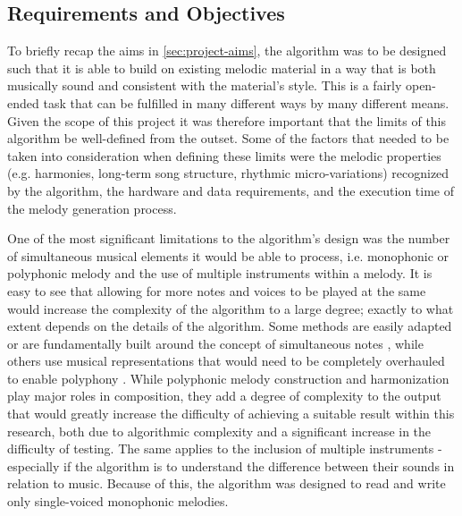 \documentclass[ author={Stephen Livermore-Tozer},
				supervisor={Dr. Peter Flach},
				degree={MEng},
				title={Algorithmic Co-composition Using Machine Learning},
				subtitle={},
				type={research},
				year={2016} ]{dissertation}
\begin{document}
	\subsection{Requirements and Objectives}
	
	To briefly recap the aims in \ref{sec:project-aims}, the algorithm was to be designed such that it is able to build on existing melodic material in a way that is both musically sound and consistent with the material's style. This is a fairly open-ended task that can be fulfilled in many different ways by many different means. Given the scope of this project it was therefore important that the limits of this algorithm be well-defined from the outset. Some of the factors that needed to be taken into consideration when defining these limits were the melodic properties (e.g. harmonies, long-term song structure, rhythmic micro-variations) recognized by the algorithm, the hardware and data requirements, and the execution time of the melody generation process. 
	
	One of the most significant limitations to the algorithm's design was the number of simultaneous musical elements it would be able to process, i.e. monophonic or polyphonic melody and the use of multiple instruments within a melody. It is easy to see that allowing for more notes and voices to be played at the same would increase the complexity of the algorithm to a large degree; exactly to what extent depends on the details of the algorithm. Some methods are easily adapted or are fundamentally built around the concept of simultaneous notes \cite{boenn2008automatic}, while others use musical representations that would need to be completely overhauled to enable polyphony \cite{todd1989connectionist}. While polyphonic melody construction and harmonization play major roles in composition, they add a degree of complexity to the output that would greatly increase the difficulty of achieving a suitable result within this research, both due to algorithmic complexity and a significant increase in the difficulty of testing. The same applies to the inclusion of multiple instruments - especially if the algorithm is to understand the difference between their sounds in relation to music. Because of this, the algorithm was designed to read and write only single-voiced monophonic melodies. 
	
\end{document}
